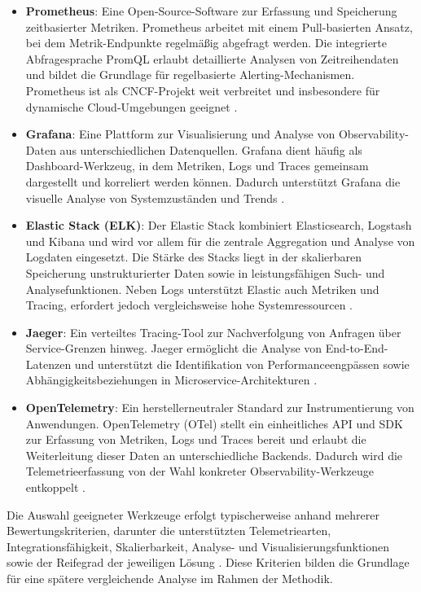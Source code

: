 \begin{itemize}
\item \textbf{Prometheus}: Eine Open-Source-Software zur Erfassung und Speicherung zeitbasierter Metriken. Prometheus arbeitet mit einem Pull-basierten Ansatz, bei dem Metrik-Endpunkte regelmäßig abgefragt werden. Die integrierte Abfragesprache PromQL erlaubt detaillierte Analysen von Zeitreihendaten und bildet die Grundlage für regelbasierte Alerting-Mechanismen. Prometheus ist als CNCF-Projekt weit verbreitet und insbesondere für dynamische Cloud-Umgebungen geeignet \cite{banerjee2024comparative}.
\item \textbf{Grafana}: Eine Plattform zur Visualisierung und Analyse von Observability-Daten aus unterschiedlichen Datenquellen. Grafana dient häufig als Dashboard-Werkzeug, in dem Metriken, Logs und Traces gemeinsam dargestellt und korreliert werden können. Dadurch unterstützt Grafana die visuelle Analyse von Systemzuständen und Trends \cite{giamattei2024monitoring}.
\item \textbf{Elastic Stack (ELK)}: Der Elastic Stack kombiniert Elasticsearch, Logstash und Kibana und wird vor allem für die zentrale Aggregation und Analyse von Logdaten eingesetzt. Die Stärke des Stacks liegt in der skalierbaren Speicherung unstrukturierter Daten sowie in leistungsfähigen Such- und Analysefunktionen. Neben Logs unterstützt Elastic auch Metriken und Tracing, erfordert jedoch vergleichsweise hohe Systemressourcen \cite{banerjee2024comparative}.
\item \textbf{Jaeger}: Ein verteiltes Tracing-Tool zur Nachverfolgung von Anfragen über Service-Grenzen hinweg. Jaeger ermöglicht die Analyse von End-to-End-Latenzen und unterstützt die Identifikation von Performanceengpässen sowie Abhängigkeitsbeziehungen in Microservice-Architekturen \cite{albuquerque2025tracing}.
\item \textbf{OpenTelemetry}: Ein herstellerneutraler Standard zur Instrumentierung von Anwendungen. OpenTelemetry (OTel) stellt ein einheitliches API und SDK zur Erfassung von Metriken, Logs und Traces bereit und erlaubt die Weiterleitung dieser Daten an unterschiedliche Backends. Dadurch wird die Telemetrieerfassung von der Wahl konkreter Observability-Werkzeuge entkoppelt \cite{albuquerque2025tracing}.
\end{itemize}

Die Auswahl geeigneter Werkzeuge erfolgt typischerweise anhand mehrerer Bewertungskriterien, darunter die unterstützten Telemetriearten, Integrationsfähigkeit, Skalierbarkeit, Analyse- und Visualisierungsfunktionen sowie der Reifegrad der jeweiligen Lösung \cite{giamattei2024monitoring}. Diese Kriterien bilden die Grundlage für eine spätere vergleichende Analyse im Rahmen der Methodik.




